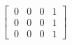 \documentclass[preview]{standalone}
\begin{document}
\begin{center}
$\begin{bmatrix}\
                  0 & 0 & 0 & 1\\\
                  0 & 0 & 0 & 1\\\
                  0 & 0 & 0 & 1\end{bmatrix}$
\end{center}
\end{document}
